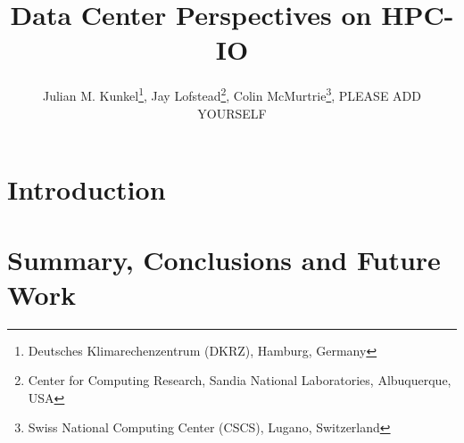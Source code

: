 \documentclass{superfri}
\numberwithin{equation}{section}
\begin{document}
\author{Julian M. Kunkel\footnote{\label{dkrz}Deutsches Klimarechenzentrum (DKRZ), Hamburg, Germany}, 
Jay Lofstead\footnote{Center for Computing Research, Sandia National Laboratories, Albuquerque, USA}, 
Colin McMurtrie\footnote{Swiss National Computing Center (CSCS), Lugano, Switzerland}, 
PLEASE ADD YOURSELF
} %

\title{Data Center Perspectives on HPC-IO}
\maketitle{}

\begin{abstract}

\noindent
{}
\end{abstract}

\section{Introduction}
\label{sec:intro}


\noindent


\section{Summary, Conclusions and Future Work}
\label{sec:summary}





\end{document}
